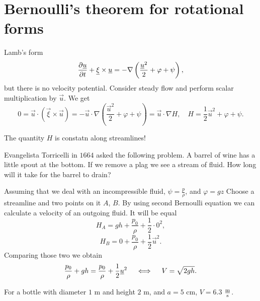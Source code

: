 \documentclass[../main.tex]{subfiles}
\begin{document}
  \section{Bernoulli's theorem for rotational forms}
  
  Lamb's form 
  \begin{displaymath}
    \frac{\partial \underline{u}}{\partial t} + \underline{\xi} \times \underline{u} = - \nabla \left( \frac{\underline{u}^2}{2} + \varphi + \psi \right),
  \end{displaymath}
  but there is no velocity potential.
  Consider steady flow and perform scalar multiplication by $\vec u$.
  We get 
  \begin{displaymath}
    0 = \vec u \cdot (\vec \xi \times \vec u) 
    = - \vec u \cdot\nabla \left(\frac{\vec u^2}{2} + \varphi + \psi\right)
    = \vec u \cdot \nabla H, \quad H = \frac{1}{2} \vec u^2 + \varphi + \psi.
  \end{displaymath}
  
  The quantity $H$ is constatn along streamlines!

  Evangelista Torricelli in $1664$ asked the following problem.
  A barrel of wine has a little spout at the bottom. 
  If we remove a plag we see a stream of fluid.
  How long will it take for the barrel to drain?

  Assuming that we deal with an incompressible fluid, $\psi = \frac{p}{\rho}$, and $\varphi = g z$
  Choose a streamline and two points on it $A$, $B$.
  By using second Bernoulli equation we can calculate a velocity of an outgoing fluid.
  It will be equal
  \begin{displaymath}
    H_A = gh + \frac{p_0}{\rho} + \frac{1}{2} \cdot 0 ^2 ,
  \end{displaymath}
  \begin{displaymath}
    H_B = 0 + \frac{p_0}{\rho} + \frac{1}{2} \vec u^2.
  \end{displaymath}
  Comparing those two we obtain
  \begin{displaymath}
    \frac{p_0}{\rho} + gh = \frac{p_0}{\rho} + \frac{1}{2} \underline{u}^2 \quad \iff \quad V = \sqrt{2gh}.
  \end{displaymath}

  For a bottle with diameter $1$ m and height $2$ m, and $a = 5$ cm, $V = 6.3$ $\frac{\textrm{m}}{\textrm{s}}$.
  
\end{document}
